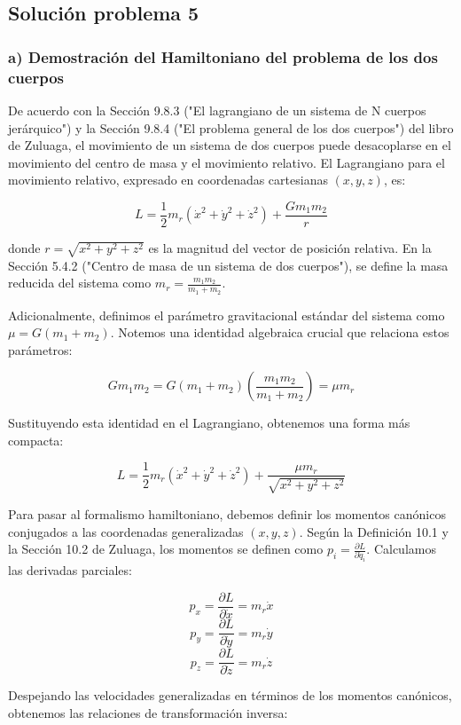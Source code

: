 \documentclass[a4paper]{article}
\begin{document}
\subsection{Solución problema 5}

\subsubsection*{a) Demostración del Hamiltoniano del problema de los dos cuerpos}

De acuerdo con la Sección 9.8.3 ("El lagrangiano de un sistema de N cuerpos jerárquico") y la Sección 9.8.4 ("El problema general de los dos cuerpos") del libro de Zuluaga, el movimiento de un sistema de dos cuerpos puede desacoplarse en el movimiento del centro de masa y el movimiento relativo. El Lagrangiano para el movimiento relativo, expresado en coordenadas cartesianas $(x, y, z)$, es:

$$L = \frac{1}{2}m_r (\dot{x}^2 + \dot{y}^2 + \dot{z}^2) + \frac{G m_1 m_2}{r}$$

donde $r = \sqrt{x^2 + y^2 + z^2}$ es la magnitud del vector de posición relativa. En la Sección 5.4.2 ("Centro de masa de un sistema de dos cuerpos"), se define la masa reducida del sistema como $m_r = \frac{m_1 m_2}{m_1 + m_2}$. 

Adicionalmente, definimos el parámetro gravitacional estándar del sistema como $\mu = G(m_1 + m_2)$. Notemos una identidad algebraica crucial que relaciona estos parámetros:

$$G m_1 m_2 = G(m_1 + m_2) \left( \frac{m_1 m_2}{m_1 + m_2} \right) = \mu m_r$$

Sustituyendo esta identidad en el Lagrangiano, obtenemos una forma más compacta:

$$L = \frac{1}{2}m_r (\dot{x}^2 + \dot{y}^2 + \dot{z}^2) + \frac{\mu m_r}{\sqrt{x^2 + y^2 + z^2}}$$

Para pasar al formalismo hamiltoniano, debemos definir los momentos canónicos conjugados a las coordenadas generalizadas $(x, y, z)$. Según la Definición 10.1 y la Sección 10.2 de Zuluaga, los momentos se definen como $p_i = \frac{\partial L}{\partial \dot{q}_i}$. Calculamos las derivadas parciales:

$$p_x = \frac{\partial L}{\partial \dot{x}} = m_r \dot{x}$$
$$p_y = \frac{\partial L}{\partial \dot{y}} = m_r \dot{y}$$
$$p_z = \frac{\partial L}{\partial \dot{z}} = m_r \dot{z}$$

Despejando las velocidades generalizadas en términos de los momentos canónicos, obtenemos las relaciones de transformación inversa:
\end{document}
